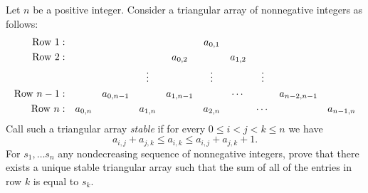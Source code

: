 Let $n$ be a positive integer. Consider a triangular array of nonnegative integers as follows:
\[\begin{array}{rccccccccc}
	\text{Row } 1:  &&&&& a_{0,1} &&&& \smallskip\\
	\text{Row } 2:  &&&& a_{0,2} && a_{1,2} &&& \smallskip\\
	&&& \vdots && \vdots && \vdots && \smallskip\\
	\text{Row } n-1: && a_{0,n-1} && a_{1,n-1} && \cdots && a_{n-2,n-1} & \smallskip\\
	\text{Row } n: & a_{0,n} && a_{1,n} && a_{2,n} && \cdots && a_{n-1,n}
\end{array}\]
Call such a triangular array \emph{stable} if for every $0 \le i < j < k \le n$ we have \[ a_{i,j} + a_{j,k} \le a_{i,k} \le a_{i,j} + a_{j,k} + 1. \] For $s_1, \ldots s_n$ any nondecreasing sequence of nonnegative integers, prove that there exists a unique stable triangular array such that the sum of all of the entries in row $k$ is equal to $s_k$.